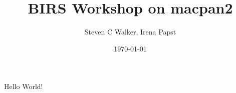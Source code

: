 \documentclass{article}
\title{BIRS Workshop on macpan2}
\date{\today}
\author{Steven C Walker, Irena Papst}
\begin{document}
  \maketitle
  \newpage

  Hello World!
\end{document}
